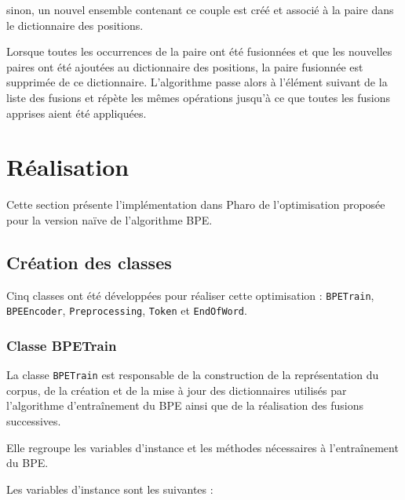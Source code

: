 \documentclass[12pt,a4paper]{report}
\begin{document}
\begin{enumerate}
\begin{enumerate}
\begin{itemizeFB}
 				\item sinon, un nouvel ensemble contenant ce couple est créé et associé à la paire dans le dictionnaire des positions.
 			\end{itemizeFB}
 			
 		Lorsque toutes les occurrences de la paire ont été fusionnées et que les nouvelles paires ont été ajoutées au dictionnaire des positions, la paire fusionnée est supprimée de ce dictionnaire. L'algorithme passe alors à l'élément suivant de la liste des fusions et répète les mêmes opérations jusqu'à ce que toutes les fusions apprises aient été appliquées.
		\end{enumerate}
	\end{enumerate}
	
	\section{Réalisation}
	
	Cette section présente l’implémentation dans Pharo de l’optimisation proposée pour la version naïve de l’algorithme BPE.
	
	\subsection{Création des classes}
	
	Cinq classes ont été développées pour réaliser cette optimisation : \texttt{BPETrain}, \texttt{BPEEncoder}, \texttt{Preprocessing}, \texttt{Token} et \texttt{EndOfWord}.
	
	\subsubsection{Classe BPETrain}
	
	La classe \texttt{BPETrain} est responsable de la construction de la représentation du corpus, de la création et de la mise à jour des dictionnaires utilisés par l'algorithme d'entraînement du BPE ainsi que de la réalisation des fusions successives.
	
	Elle regroupe les variables d’instance et les méthodes nécessaires à l’entraînement du BPE.
	
	Les variables d’instance sont les suivantes :
	
\end{document}
